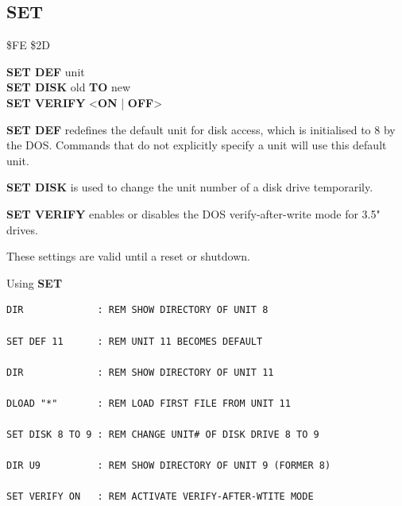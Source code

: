 
\newpage
\subsection{SET}
\begin{description}[leftmargin=2cm,style=nextline]
\item [Token:]    \$FE \$2D

\item [Format:]   {\bf SET DEF} unit \\
                  {\bf SET DISK} old {\bf TO} new \\
                  {\bf SET VERIFY} <{\bf ON} | {\bf OFF}>

\item [Usage:]    {\bf SET DEF} redefines the default unit for disk access, which is initialised to 8 by the DOS. Commands that do not explicitly specify a unit will use this default unit.

                  {\bf SET DISK} is used to change the unit number of a disk drive temporarily.

                  {\bf SET VERIFY} enables or disables the DOS verify-after-write mode for 3.5" drives.

\item [Remarks:]  These settings are valid until a reset or shutdown.

\item [Examples:] Using {\bf SET}

\begin{tcolorbox}[colback=black,coltext=white]
\verbatimfont{\codefont}
\begin{verbatim}
DIR             : REM SHOW DIRECTORY OF UNIT 8

SET DEF 11      : REM UNIT 11 BECOMES DEFAULT

DIR             : REM SHOW DIRECTORY OF UNIT 11

DLOAD "*"       : REM LOAD FIRST FILE FROM UNIT 11

SET DISK 8 TO 9 : REM CHANGE UNIT# OF DISK DRIVE 8 TO 9

DIR U9          : REM SHOW DIRECTORY OF UNIT 9 (FORMER 8)

SET VERIFY ON   : REM ACTIVATE VERIFY-AFTER-WTITE MODE
\end{verbatim}
\end{tcolorbox}
\end{description}


